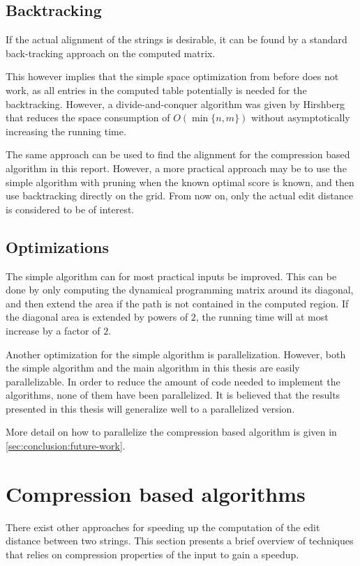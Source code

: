 \documentclass[twoside,11pt,openright]{report}
\begin{document}
\subsection{Backtracking}
If the actual alignment of the strings is desirable, it can be found by a standard back-tracking approach on the computed matrix.

This however implies that the simple space optimization from before does not work, as all entries in the computed table potentially is needed for the backtracking. However, a divide-and-conquer algorithm was given by Hirshberg \cite[p. 254]{gusfield1997algorithms} that reduces the space consumption of $O(\min\{n, m\})$ without asymptotically increasing the running time.

The same approach can be used to find the alignment for the compression based algorithm in this report. However, a more practical approach may be to use the simple algorithm with pruning when the known optimal score is known, and then use backtracking directly on the grid. From now on, only the actual edit distance is considered to be of interest.

\subsection{Optimizations}
The simple algorithm can for most practical inputs be improved. This can be done by only computing the dynamical programming matrix around its diagonal, and then extend the area if the path is not contained in the computed region. If the diagonal area is extended by powers of $2$, the running time will at most increase by a factor of $2$.

Another optimization for the simple algorithm is parallelization. However, both the simple algorithm and the main algorithm in this thesis \cite{Gawrychowski:2012:FAC:2422024.2422048} are easily parallelizable. In order to reduce the amount of code needed to implement the algorithms, none of them have been parallelized. It is believed that the results presented in this thesis will generalize well to a parallelized version.

More detail on how to parallelize the compression based algorithm is given in \cref{sec:conclusion:future-work}.

\section{Compression based algorithms}
There exist other approaches for speeding up the computation of the edit distance between two strings. This section presents a brief overview of techniques that relies on compression properties of the input to gain a speedup.
\end{document}
